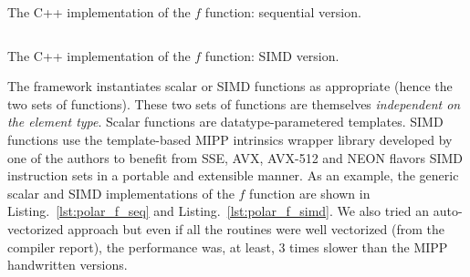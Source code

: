 \begin{listing}
  \inputminted[frame=lines,linenos]{C++}{main/chapter2/src/polar/f_seq.cpp}
  \caption{The C++ implementation of the $f$ function: sequential version.}
  \label{lst:polar_f_seq}
\end{listing}

\begin{listing}
  \inputminted[frame=lines,linenos]{C++}{main/chapter2/src/polar/f_simd.cpp}
  \caption{The C++ implementation of the $f$ function: SIMD version.}
  \label{lst:polar_f_simd}
\end{listing}

The framework instantiates scalar or SIMD functions as appropriate (hence the
two sets of functions). These two sets of functions are themselves
\emph{independent on the element type}. Scalar functions are
datatype-parametered templates. SIMD functions use the template-based MIPP
intrinsics wrapper library developed by one of the authors to benefit from SSE,
AVX, AVX-512 and NEON flavors SIMD instruction sets in a portable and extensible
manner. As an example, the generic scalar and SIMD implementations of the $f$
function are shown in Listing.~\ref{lst:polar_f_seq} and
Listing.~\ref{lst:polar_f_simd}. We also tried an auto-vectorized approach but even
if all the routines were well vectorized (from the compiler report), the
performance was, at least, 3 times slower than the MIPP handwritten versions.

